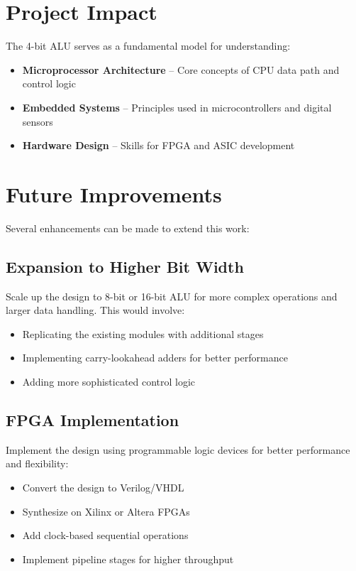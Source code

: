 \section{Project Impact}

The 4-bit ALU serves as a fundamental model for understanding:
\begin{itemize}
    \item \textbf{Microprocessor Architecture} -- Core concepts of CPU data path and control logic
    \item \textbf{Embedded Systems} -- Principles used in microcontrollers and digital sensors
    \item \textbf{Hardware Design} -- Skills for FPGA and ASIC development
\end{itemize}

\section{Future Improvements}

Several enhancements can be made to extend this work:

\subsection{Expansion to Higher Bit Width}
Scale up the design to 8-bit or 16-bit ALU for more complex operations and larger data handling. This would involve:
\begin{itemize}
    \item Replicating the existing modules with additional stages
    \item Implementing carry-lookahead adders for better performance
    \item Adding more sophisticated control logic
\end{itemize}

\subsection{FPGA Implementation}
Implement the design using programmable logic devices for better performance and flexibility:
\begin{itemize}
    \item Convert the design to Verilog/VHDL
    \item Synthesize on Xilinx or Altera FPGAs
    \item Add clock-based sequential operations
    \item Implement pipeline stages for higher throughput
\end{itemize}

